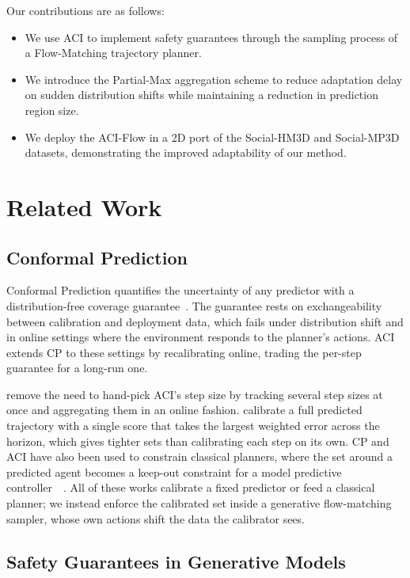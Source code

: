 \documentclass[letterpaper]{article} %
\begin{document}
Our contributions are as follows:
\begin{itemize}
    \item We use ACI to implement safety guarantees through the sampling process of a Flow-Matching trajectory planner. 
    \item We introduce the Partial-Max aggregation scheme to reduce adaptation delay on sudden distribution shifts while maintaining a reduction in prediction region size. 
    \item We deploy the ACI-Flow in a 2D port of the Social-HM3D and Social-MP3D datasets, demonstrating the improved adaptability of our method.
\end{itemize}

\section{Related Work}

\subsection{Conformal Prediction}
\label{subsec:cp}

Conformal Prediction quantifies the uncertainty of any predictor with a distribution-free coverage guarantee~\cite{stephen_gentle_2021}. The guarantee rests on exchangeability between calibration and deployment data, which fails under distribution shift and in online settings where the environment responds to the planner's actions. ACI extends CP to these settings by recalibrating online, trading the per-step guarantee for a long-run one.

\citeauthor{zaffran_aci_time_series_2022} remove the need to hand-pick ACI's step size by tracking several step sizes at once and aggregating them in an online fashion. \citeauthor{cleaveland_conformal_2024} calibrate a full predicted trajectory with a single score that takes the largest weighted error across the horizon, which gives tighter sets than calibrating each step on its own. CP and ACI have also been used to constrain classical planners, where the set around a predicted agent becomes a keep-out constraint for a model predictive controller~\cite{lindemann_safe_2023}~\cite{dixit_aci-planning_2023}. All of these works calibrate a fixed predictor or feed a classical planner; we instead enforce the calibrated set inside a generative flow-matching sampler, whose own actions shift the data the calibrator sees.

\subsection{Safety Guarantees in Generative Models}
\end{document}
